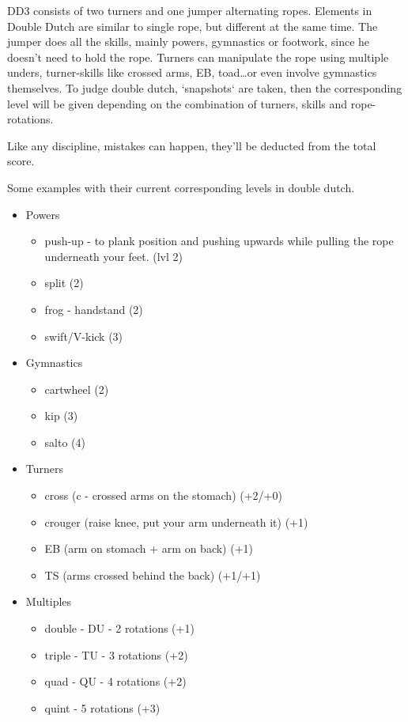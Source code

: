 DD3 consists of two turners and one jumper alternating ropes. Elements in Double Dutch are similar to single rope, but different at the same time. The jumper does all the skills, mainly powers, gymnastics or footwork, since he doesn't need to hold the rope. Turners can manipulate the rope using multiple unders, turner-skills like crossed arms, EB, toad\dots or even involve gymnastics themselves.
To judge double dutch, `snapshots` are taken, then the corresponding level will be given depending on the combination of turners, skills and rope-rotations.

Like any discipline, mistakes can happen, they'll be deducted from the total score.

Some examples with their current corresponding levels in double dutch.

\begin{itemize}
    \item Powers
    \begin{itemize}
        \item push-up - to plank position and pushing upwards while pulling the rope underneath your feet. (lvl 2)
        \item split (2)
        \item frog - handstand (2)
        \item swift/V-kick (3)
    \end{itemize}
    \item Gymnastics
    \begin{itemize}
        \item cartwheel (2)
        \item kip (3)
        \item salto (4)
    \end{itemize}
    \item Turners
    \begin{itemize}
        \item cross (c - crossed arms on the stomach) (+2/+0)
        \item crouger (raise knee, put your arm underneath it) (+1)
        \item EB (arm on stomach + arm on back) (+1)
        \item TS (arms crossed behind the back) (+1/+1)
    \end{itemize}
    \item Multiples
    \begin{itemize}
        \item double - DU - 2 rotations (+1)
        \item triple - TU - 3 rotations (+2)
        \item quad - QU - 4 rotations (+2)
        \item quint - 5 rotations (+3)
    \end{itemize}
\end{itemize}

